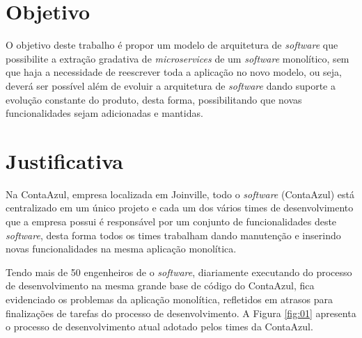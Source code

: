 \section{Objetivo}

O objetivo deste trabalho é propor um modelo de arquitetura de \textit{software} que possibilite a extração gradativa de \textit{microservices} de um \textit{software} monolítico, sem que haja a necessidade de reescrever toda a aplicação no novo modelo, ou seja, deverá ser possível além de evoluir a arquitetura de \textit{software} dando suporte a evolução constante do produto, desta forma, possibilitando que novas funcionalidades sejam adicionadas e mantidas.

\section{Justificativa}

Na ContaAzul, empresa localizada em Joinville, todo o \textit{software} (ContaAzul) está centralizado em um único projeto e cada um dos vários times de desenvolvimento que a empresa possui é responsável por um conjunto de funcionalidades deste \textit{software}, desta forma todos os times trabalham dando manutenção e inserindo novas funcionalidades na mesma aplicação monolítica.

Tendo mais de 50 engenheiros de  o \textit{software}, diariamente executando do processo de desenvolvimento na mesma grande base de código do ContaAzul, fica evidenciado os problemas da aplicação monolítica, refletidos em atrasos para finalizações de tarefas do processo de desenvolvimento. A Figura \ref{fig:01} apresenta o processo de desenvolvimento atual adotado pelos times da ContaAzul.

